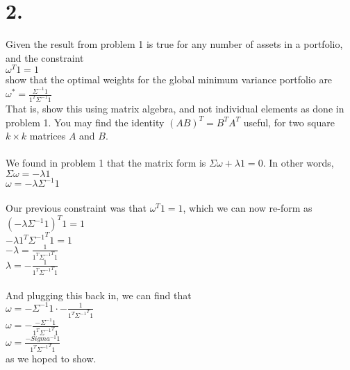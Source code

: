 \documentclass{article}
\begin{document}
\section*{2.}
{\Large

Given the result from problem 1 is true for any number of assets in a portfolio, and the constraint \\ 
$\omega^T1 = 1$ \\
show that the optimal weights for the global minimum variance portfolio are \\ 
$\omega^* = \frac{\Sigma^{-1}1}{1^T\Sigma^{-1}1}$ \\
That is, show this using matrix algebra, and not individual elements as done in problem 1. You may find the identity $(AB)^T = B^TA^T$ useful, for two square $k \times k$ matrices $A$ and $B$. \\ \\

We found in problem 1 that the matrix form is $\Sigma \omega + \lambda 1 = 0$. In other words, \\
$\Sigma \omega = -\lambda1$ \\
$\omega = -\lambda\Sigma^{-1}1$ \\ \\
Our previous constraint was that $\omega^T 1 = 1$, which we can now re-form as \\
$(-\lambda \Sigma^{-1} 1)^T 1 = 1$ \\
$-\lambda 1^T {\Sigma^{-1}}^T 1 = 1$ \\
$-\lambda = \frac{1}{1^T {\Sigma^{-1}}^T 1}$ \\
$\lambda = -\frac{1}{1^T {\Sigma^{-1}}^T 1}$ \\ \\
And plugging this back in, we can find that \\
$\omega = -\Sigma^{-1}1 \cdot -\frac{1}{1^T {\Sigma^{-1}}^T 1}$ \\
$\omega = -\frac{-\Sigma^{-1}1}{1^T {\Sigma^{-1}}^T 1}$ \\
$\omega = \frac{-Sigma^{-1}1}{1^T {\Sigma^{-1}}^T 1}$ \\
as we hoped to show.

}
\end{document}
